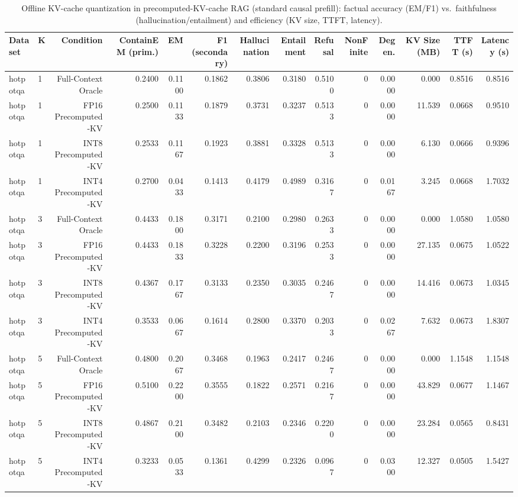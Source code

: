 \begin{table}[t]
\centering
\small
\begin{tabular}{llrrrrrrrrrrrr}
\toprule
Dataset & K & Condition & ContainEM (prim.) & EM & F1 (secondary) & Hallucination & Entailment & Refusal & NonFinite & Degen. & KV Size (MB) & TTFT (s) & Latency (s) \\
\midrule
hotpotqa & 1 & Full-Context Oracle & 0.2400 & 0.1100 & 0.1862 & 0.3806 & 0.3180 & 0.5100 & 0 & 0.0000 & 0.000 & 0.8516 & 0.8516 \\
hotpotqa & 1 & FP16 Precomputed-KV & 0.2500 & 0.1133 & 0.1879 & 0.3731 & 0.3237 & 0.5133 & 0 & 0.0000 & 11.539 & 0.0668 & 0.9510 \\
hotpotqa & 1 & INT8 Precomputed-KV & 0.2533 & 0.1167 & 0.1923 & 0.3881 & 0.3328 & 0.5133 & 0 & 0.0000 & 6.130 & 0.0666 & 0.9396 \\
hotpotqa & 1 & INT4 Precomputed-KV & 0.2700 & 0.0433 & 0.1413 & 0.4179 & 0.4989 & 0.3167 & 0 & 0.0167 & 3.245 & 0.0668 & 1.7032 \\
hotpotqa & 3 & Full-Context Oracle & 0.4433 & 0.1800 & 0.3171 & 0.2100 & 0.2980 & 0.2633 & 0 & 0.0000 & 0.000 & 1.0580 & 1.0580 \\
hotpotqa & 3 & FP16 Precomputed-KV & 0.4433 & 0.1833 & 0.3228 & 0.2200 & 0.3196 & 0.2533 & 0 & 0.0000 & 27.135 & 0.0675 & 1.0522 \\
hotpotqa & 3 & INT8 Precomputed-KV & 0.4367 & 0.1767 & 0.3133 & 0.2350 & 0.3035 & 0.2467 & 0 & 0.0000 & 14.416 & 0.0673 & 1.0345 \\
hotpotqa & 3 & INT4 Precomputed-KV & 0.3533 & 0.0667 & 0.1614 & 0.2800 & 0.3370 & 0.2033 & 0 & 0.0267 & 7.632 & 0.0673 & 1.8307 \\
hotpotqa & 5 & Full-Context Oracle & 0.4800 & 0.2067 & 0.3468 & 0.1963 & 0.2417 & 0.2467 & 0 & 0.0000 & 0.000 & 1.1548 & 1.1548 \\
hotpotqa & 5 & FP16 Precomputed-KV & 0.5100 & 0.2200 & 0.3555 & 0.1822 & 0.2571 & 0.2167 & 0 & 0.0000 & 43.829 & 0.0677 & 1.1467 \\
hotpotqa & 5 & INT8 Precomputed-KV & 0.4867 & 0.2100 & 0.3482 & 0.2103 & 0.2346 & 0.2200 & 0 & 0.0000 & 23.284 & 0.0565 & 0.8431 \\
hotpotqa & 5 & INT4 Precomputed-KV & 0.3233 & 0.0533 & 0.1361 & 0.4299 & 0.2326 & 0.0967 & 0 & 0.0300 & 12.327 & 0.0505 & 1.5427 \\
\bottomrule
\end{tabular}
\caption{Offline KV-cache quantization in precomputed-KV-cache RAG (standard causal prefill): factual accuracy (EM/F1) vs.\ faithfulness (hallucination/entailment) and efficiency (KV size, TTFT, latency).}
\label{tab:main}
\end{table}
